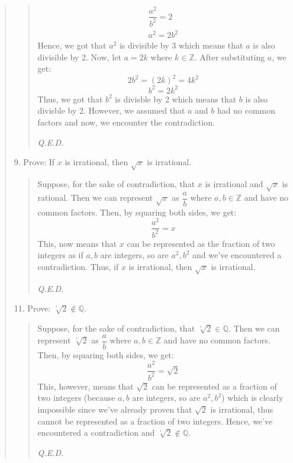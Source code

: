 \documentclass[12pt, a4paper]{article}                      %
\begin{document}
\begin{enumerate}
\begin{quote}
\begin{quote}
\begin{align*}
\dfrac{a^2}{b^2} = 2\\
a^2 = 2b^2
\end{align*}
Hence, we got that $a^2$ is divisible by 3 which means that $a$ is also divisible by 2.
Now, let $a = 2k$ where $k \in \mathbb{Z}$. After substituting $a$, we get:
$$2b^2 = (2k)^2 = 4k^2$$
$$b^2 = 2k^2$$
Thus, we got that $b^2$ is divisble by 2 which means that $b$ is also divisble by 2.
However, we assumed that $a$ and $b$ had no common factors and now, we encounter the
contradiction.
\begin{flushright}
\textit{Q.E.D.}
\end{flushright}
\end{quote}
\item[9.]
Prove: If $x$ is irrational, then $\sqrt{x}$ is irrational.
\begin{quote}
Suppose, for the sake of contradiction, that $x$ is irrational and $\sqrt{x}$
is rational. Then we can represent $\sqrt{x}$ as $\dfrac{a}{b}$ where $a,b \in \mathbb{Z}$
and have no common factors. Then, by squaring both sides, we get:
$$\dfrac{a^2}{b^2} = x$$
This, now means that $x$ can be represented as the fraction of two integers
as if $a, b$ are integers, so are $a^2, b^2$ and we've encountered a contradiction.
Thus, if $x$ is irrational, then $\sqrt{x}$ is irrational.
\begin{flushright}
\textit{Q.E.D.}
\end{flushright}
\end{quote}
\newpage
\item[11.]
Prove: $\sqrt[^4]{2} \notin \mathbb{Q}$.
\begin{quote}
Suppose, for the sake of contradiction, that $\sqrt[^4]{2} \in \mathbb{Q}$.
Then we can represent $\sqrt[^4]{2}$ as $\dfrac{a}{b}$ where $a,b \in \mathbb{Z}$
and have no common factors. Then, by squaring both sides, we get:
$$\dfrac{a^2}{b^2} = \sqrt{2}$$
This, however, means that $\sqrt{2}$ can be represented as a fraction of two integers
(because $a, b$ are integers, so are $a^2, b^2$) which is clearly impossible since
we've already proven that $\sqrt{2}$ is irrational, thus cannot be represented as a fraction
of two integers. Hence, we've encountered a contradiction and $\sqrt[^4]{2} \notin \mathbb{Q}$.
\begin{flushright}
\textit{Q.E.D.}
\end{flushright}
\end{quote}
\end{quote}

\end{enumerate}
\end{document}
